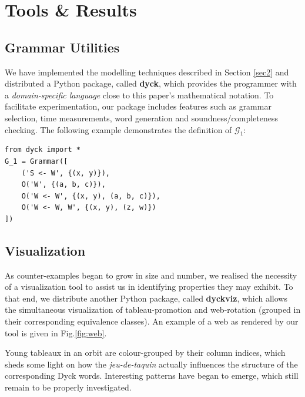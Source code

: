 \documentclass[nonatbib,numbers,10pt]{llncs}
\begin{document}
\section{Tools \& Results}
\subsection{Grammar Utilities}
We have implemented the modelling techniques described in Section \ref{sec2} and distributed a Python package, called \textbf{dyck}, which provides the programmer with a \textit{domain-specific language} close to this paper's mathematical notation. To facilitate experimentation, our package includes features such as grammar selection, time measurements, word generation and soundness/completeness checking. The following example demonstrates the definition of $\mathcal{G}_1$:

\begin{center}
\begin{minipage}{0.5\textwidth}
\begin{verbatim}
from dyck import *
G_1 = Grammar([
    ('S <- W', {(x, y)}),
    O('W', {(a, b, c)}),
    O('W <- W', {(x, y), (a, b, c)}),
    O('W <- W, W', {(x, y), (z, w)}) 
])
\end{verbatim}
\end{minipage}
\end{center}


\subsection{Visualization}
As counter-examples began to grow in size and number, we realised the necessity of a visualization tool to assist us in identifying properties they may exhibit. To that end, we distribute another Python package, called \textbf{dyckviz}, which allows the simultaneous visualization of tableau-promotion and web-rotation (grouped in their corresponding equivalence classes). An example of a web as rendered by our tool is given in Fig.\ref{fig:web}.

Young tableaux in an orbit are colour-grouped by their column indices, which sheds some light on how the \textit{jeu-de-taquin} actually influences the structure of the corresponding Dyck words. Interesting patterns have began to emerge, which still remain to be properly investigated. 
\end{document}
